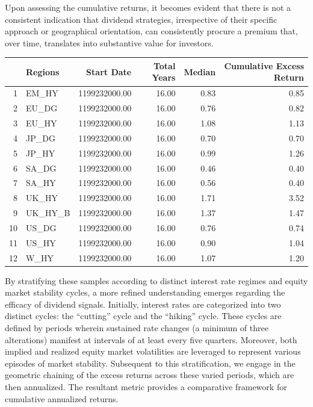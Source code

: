 \documentclass[11pt,preprint, authoryear]{elsarticle}
\let\origtable\table
\let\endorigtable\endtable
\renewenvironment{table}[1][2] {
    \expandafter\origtable\expandafter[H]
} {
    \endorigtable
}
\numberwithin{equation}{section}
\numberwithin{figure}{section}
\numberwithin{table}{section}
\begin{document}
Upon assessing the cumulative returns, it becomes evident that there is
not a consistent indication that dividend strategies, irrespective of
their specific approach or geographical orientation, can consistently
procure a premium that, over time, translates into substantive value for
investors.

\begin{table}[H]
\centering
\begin{tabular}{rlrrrr}
  \hline
 & Regions & Start Date & Total Years & Median & Cumulative Excess Return \\ 
  \hline
1 & EM\_HY & 1199232000.00 & 16.00 & 0.83 & 0.85 \\ 
  2 & EU\_DG & 1199232000.00 & 16.00 & 0.76 & 0.82 \\ 
  3 & EU\_HY & 1199232000.00 & 16.00 & 1.08 & 1.13 \\ 
  4 & JP\_DG & 1199232000.00 & 16.00 & 0.70 & 0.70 \\ 
  5 & JP\_HY & 1199232000.00 & 16.00 & 0.99 & 1.26 \\ 
  6 & SA\_DG & 1199232000.00 & 16.00 & 0.46 & 0.40 \\ 
  7 & SA\_HY & 1199232000.00 & 16.00 & 0.56 & 0.40 \\ 
  8 & UK\_HY & 1199232000.00 & 16.00 & 1.71 & 3.52 \\ 
  9 & UK\_HY\_B & 1199232000.00 & 16.00 & 1.37 & 1.47 \\ 
  10 & US\_DG & 1199232000.00 & 16.00 & 0.76 & 0.74 \\ 
  11 & US\_HY & 1199232000.00 & 16.00 & 0.90 & 1.04 \\ 
  12 & W\_HY & 1199232000.00 & 16.00 & 1.07 & 1.20 \\ 
   \hline
\end{tabular}
\caption{Cumulative Excess Return \label{tab1}} 
\end{table}

By stratifying these samples according to distinct interest rate regimes
and equity market stability cycles, a more refined understanding emerges
regarding the efficacy of dividend signals. Initially, interest rates
are categorized into two distinct cycles: the ``cutting'' cycle and the
``hiking'' cycle. These cycles are defined by periods wherein sustained
rate changes (a minimum of three alterations) manifest at intervals of
at least every five quarters. Moreover, both implied and realized equity
market volatilities are leveraged to represent various episodes of
market stability. Subsequent to this stratification, we engage in the
geometric chaining of the excess returns across these varied periods,
which are then annualized. The resultant metric provides a comparative
framework for cumulative annualized returns.
\end{document}
